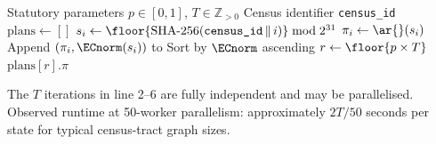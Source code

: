\begin{algorithm}
\caption{\ps{}$(p, T)$}
\label{alg:percentile-sweep}
\begin{algorithmic}[1]
\Require Statutory parameters $p \in [0,1]$, $T \in \mathbb{Z}_{>0}$
\Require Census identifier \texttt{census\_id}
\State $\text{plans} \leftarrow []$
  \State $s_i \leftarrow \floor{\text{SHA-256}(\texttt{census\_id} \,\|\, i)} \bmod 2^{31}$
  \State $\pi_i \leftarrow \ar{}(s_i)$  
  \State Append $(\pi_i, \ECnorm(s_i))$ to 
\EndFor
\State Sort  by $\ECnorm$ ascending 
\State $r \leftarrow \floor{p \times T}$
\State \Return $\text{plans}[r].\pi$
\end{algorithmic}
\end{algorithm}

The $T$ iterations in line 2--6 are fully independent and may be
parallelised.
Observed runtime at 50-worker parallelism: approximately $2T/50$
seconds per state for typical census-tract graph sizes.
